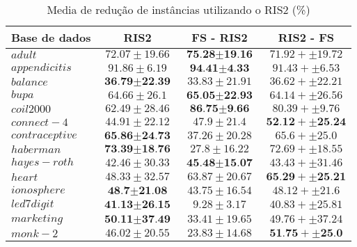 \documentclass[a4paper, 12pt]{article}
\begin{document}
\begin{table}[h!]
  \begin{center}
    \caption{Media de redução de instâncias utilizando o RIS2 (\%)}
    \label{tab:table5}
    \begin{tabular}{l|c|c|c}
      \textbf{Base de dados} & \textbf{ RIS2 } & \textbf{FS - RIS2} & \textbf{RIS2 - FS}\\
        \hline
        $adult$ & $72.07 \pm 19.66$  & $\textbf{75.28} \pm \textbf{19.16}$ & $71.92 +  \pm 19.72$ \\
        \hline
        $appendicitis$ & $91.86 \pm 6.19$  & $\textbf{94.41} \pm \textbf{4.33}$ & $91.43 +  \pm 6.53$ \\
        \hline
        $balance$ & $\textbf{36.79} \pm \textbf{22.39}$  & $33.83 \pm 21.91$ & $36.62 +  \pm 22.21$ \\
        \hline
        $bupa$ & $64.66 \pm 26.1$  & $\textbf{65.05} \pm \textbf{22.93}$ & $64.14 +  \pm 26.56$ \\
        \hline
        $coil2000$ & $62.49 \pm 28.46$  & $\textbf{86.75} \pm \textbf{9.66}$ & $80.39 +  \pm 9.76$ \\
        \hline
        $connect-4$ & $44.91 \pm 22.12$  & $47.9 \pm 21.4$ & $\textbf{52.12} +  \pm \textbf{25.24}$ \\
        \hline
        $contraceptive$ & $\textbf{65.86} \pm \textbf{24.73}$  & $37.26 \pm 20.28$ & $65.6 +  \pm 25.0$ \\
        \hline
        $haberman$ & $\textbf{73.39} \pm \textbf{18.76}$  & $27.8 \pm 16.22$ & $72.69 +  \pm 18.55$ \\
        \hline
        $hayes-roth$ & $42.46 \pm 30.33$  & $\textbf{45.48} \pm \textbf{15.07}$ & $43.43 +  \pm 31.46$ \\
        \hline
        $heart$ & $48.33 \pm 32.57$  & $63.87 \pm 20.67$ & $\textbf{65.29} +  \pm \textbf{25.21}$ \\
        \hline
        $ionosphere$ & $\textbf{48.7} \pm \textbf{21.08}$  & $43.75 \pm 16.54$ & $48.12 +  \pm 21.6$ \\
        \hline
        $led7digit$ & $\textbf{41.13} \pm \textbf{26.15}$  & $9.28 \pm 3.17$ & $40.83 +  \pm 25.81$ \\
        \hline
        $marketing$ & $\textbf{50.11} \pm \textbf{37.49}$  & $33.41 \pm 19.65$ & $49.76 +  \pm 37.24$ \\
        \hline
        $monk-2$ & $46.02 \pm 20.55$  & $23.83 \pm 14.68$ & $\textbf{51.75} +  \pm \textbf{25.0}$ \\

\end{tabular}
\end{center}
\end{table}
\end{document}
